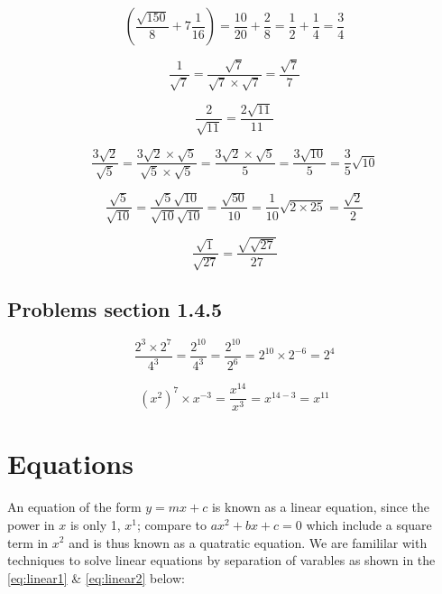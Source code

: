\begin{equation}
 \left (  \frac{\sqrt{150}}{8} + 7\frac{1}{16}\right ) = \frac{10}{20} + \frac{2}{8} = \frac{1}{2} + \frac{1}{4} = \frac{3}{4}
\end{equation}

\begin{equation}
  \frac{1}{\sqrt{7}} =  \frac{\sqrt{7}}{\sqrt{7} \times \sqrt{7}} = \frac{\sqrt{7}}{7}
\end{equation}

\begin{equation}
  \frac{2}{\sqrt{11}} = \frac{2 \sqrt{11}}{11}
\end{equation}

\begin{equation}
  \frac{3 \sqrt{2}}{\sqrt{5}} = \frac{3 \sqrt{2} \times \sqrt{5}}{\sqrt{5} \times \sqrt{5}} = \frac{3 \sqrt{2} \times \sqrt{5}}{5} = \frac{3 \sqrt{10}}{5} = \frac{3}{5}\sqrt{10}
\end{equation}

\begin{equation}
  \frac{\sqrt{5}}{\sqrt{10}} = \frac{\sqrt{5} \sqrt{10}}{\sqrt{10}\sqrt{10}} = \frac{\sqrt{50}}{10} = \frac{1}{10} \sqrt{2 \times 25} = \frac{\sqrt{2}}{2}
\end{equation}

\begin{equation}
  \frac{\sqrt{1}}{\sqrt{27}} = \frac{\sqrt{\sqrt{27}}}{27}
\end{equation}

\subsection{Problems section 1.4.5}

\begin{equation}
  \frac{2^{3} \times 2^{7}}{4^{3}} = \frac{2^{10}}{4^{3}} = \frac{2^{10}}{2^{6}} = 2^{10} \times 2^{-6} = 2^{4}
\end{equation}

\begin{equation}
  (x^{2})^{7} \times x^{-3} = \frac{x^{14}}{x^{3}} = x^{14-3} = x^{11}
\end{equation}


\section{Equations}

An equation of the form  $ y = mx + c $ is known as a linear equation, since the power in $ x $ is only 1, $ x^{1}$; compare to $ ax^{2} +bx + c = 0 $ which include a square term in $ x^{2} $ and is thus known as a quatratic equation. We are famililar with techniques to solve linear equations by separation of varables as shown in the \ref{eq:linear1} \& \ref{eq:linear2} below:


